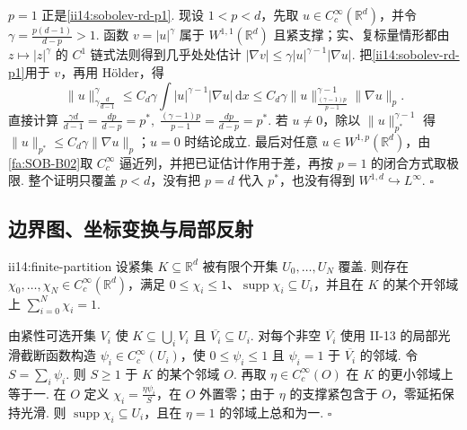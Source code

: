 \begin{FAProof}
\(\displaystyle p=1\) 正是\autoref{ii14:sobolev-rd-p1}. 现设 \(\displaystyle1<p<d\)，先取 \(\displaystyle u\in C_c^\infty(\mathbb R^d)\)，并令 \(\displaystyle\gamma=\frac{p(d-1)}{d-p}>1\). 函数 \(\displaystyle v=|u|^\gamma\) 属于 \(\displaystyle W^{1,1}(\mathbb R^d)\) 且紧支撑；实、复标量情形都由 \(\displaystyle z\mapsto|z|^\gamma\) 的 \(\displaystyle C^1\) 链式法则得到几乎处处估计 \(\displaystyle|\nabla v|\leqslant\gamma|u|^{\gamma-1}|\nabla u|\). 把\autoref{ii14:sobolev-rd-p1}用于 \(\displaystyle v\)，再用 Hölder，得
\[
\|u\|_{\gamma \frac{d}{d-1}}^\gamma
\leqslant
C_d\gamma
\int|u|^{\gamma-1}|\nabla u|\,\mathrm{d}x
\leqslant
C_d\gamma
\|u\|_{\frac{(\gamma-1)p}{p-1}}^{\gamma-1}
\|\nabla u\|_p.
\]
直接计算 \(\displaystyle \frac{\gamma d}{d-1}=\frac{dp}{d-p}=p^*, \; \frac{(\gamma-1)p}{p-1} = \frac{dp}{d-p}=p^*.\)
若 \(\displaystyle u\neq0\)，除以 \(\displaystyle\|u\|_{p^*}^{\gamma-1}\) 得 \(\displaystyle\|u\|_{p^*}\leqslant C_d\gamma\|\nabla u\|_p\)；\(\displaystyle u=0\) 时结论成立. 最后对任意 \(\displaystyle u\in W^{1,p}(\mathbb R^d)\)，由\autoref{fa:SOB-B02}取 \(\displaystyle C_c^\infty\) 逼近列，并把已证估计作用于差，再按 \(\displaystyle p=1\) 的闭合方式取极限. 整个证明只覆盖 \(\displaystyle p<d\)，没有把 \(\displaystyle p=d\) 代入 \(\displaystyle p^*\)，也没有得到 \(\displaystyle W^{1,d}\hookrightarrow L^\infty\).
\hfill\(\square\)
\end{FAProof}

\subsection{边界图、坐标变换与局部反射}

\begin{FALemma}[B][有限光滑分割单位分解]{ii14:finite-partition}
设紧集 \(\displaystyle K\subseteq\mathbb R^d\) 被有限个开集 \(\displaystyle U_0,\dots,U_N\) 覆盖. 则存在 \(\displaystyle\chi_0,\dots,\chi_N\in C_c^\infty(\mathbb R^d)\)，满足 \(\displaystyle0\leqslant\chi_i\leqslant1\)、\(\displaystyle\operatorname{supp}\chi_i\subseteq U_i\)，并且在 \(\displaystyle K\) 的某个开邻域上 \(\displaystyle\sum_{i=0}^N\chi_i=1\).
\end{FALemma}

\begin{FAProof}
由紧性可选开集 \(\displaystyle V_i\) 使 \(\displaystyle K\subseteq\bigcup_iV_i\) 且 \(\displaystyle\overline{V_i}\subseteq U_i\). 对每个非空 \(\displaystyle\overline{V_i}\) 使用 II-13 的局部光滑截断函数构造 \(\displaystyle\psi_i\in C_c^\infty(U_i)\)，使 \(\displaystyle0\leqslant\psi_i\leqslant1\) 且 \(\displaystyle\psi_i=1\) 于 \(\displaystyle\overline{V_i}\) 的邻域. 令 \(\displaystyle S=\sum_i\psi_i\). 则 \(\displaystyle S\geqslant1\) 于 \(\displaystyle K\) 的某个邻域 \(\displaystyle O\). 再取 \(\displaystyle\eta\in C_c^\infty(O)\) 在 \(\displaystyle K\) 的更小邻域上等于一. 在 \(\displaystyle O\) 定义 \(\displaystyle\chi_i=\frac{\eta\psi_i}{S}\)，在 \(\displaystyle O\) 外置零；由于 \(\displaystyle\eta\) 的支撑紧包含于 \(\displaystyle O\)，零延拓保持光滑. 则 \(\displaystyle\operatorname{supp}\chi_i\subseteq U_i\)，且在 \(\displaystyle\eta=1\) 的邻域上总和为一.
\hfill\(\square\)
\end{FAProof}

